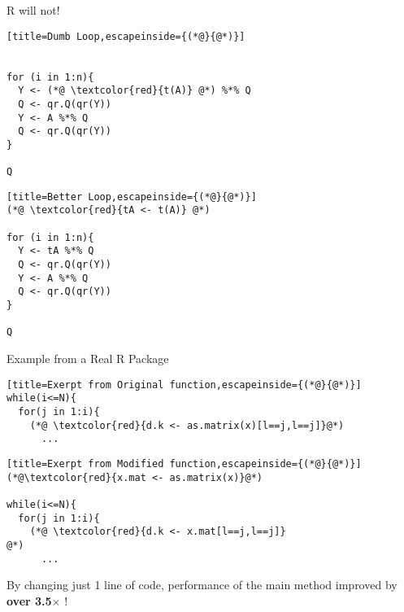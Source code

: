 \begin{frame}[fragile]{R will not!}
    \begin{center}
\begin{minipage}[t]{.45\textwidth}
\begin{lstlisting}[title=Dumb Loop,escapeinside={(*@}{@*)}]


for (i in 1:n){
  Y <- (*@ \textcolor{red}{t(A)} @*) %*% Q
  Q <- qr.Q(qr(Y))
  Y <- A %*% Q
  Q <- qr.Q(qr(Y))
}

Q
\end{lstlisting}
\end{minipage}
\begin{minipage}[t]{.45\textwidth}
\begin{lstlisting}[title=Better Loop,escapeinside={(*@}{@*)}]
(*@ \textcolor{red}{tA <- t(A)} @*)

for (i in 1:n){
  Y <- tA %*% Q
  Q <- qr.Q(qr(Y))
  Y <- A %*% Q
  Q <- qr.Q(qr(Y))
}

Q
\end{lstlisting}
\end{minipage}
\end{center}
\end{frame}


\begin{frame}[fragile]{Example from a Real R Package}
    \begin{center}
\begin{minipage}[t]{.6\textwidth}
\vspace{-.9cm}
\begin{lstlisting}[title=Exerpt from Original function,escapeinside={(*@}{@*)}]
while(i<=N){
  for(j in 1:i){
    (*@ \textcolor{red}{d.k <- as.matrix(x)[l==j,l==j]}@*)
      ...
\end{lstlisting}
\vspace{-.3cm}
\begin{lstlisting}[title=Exerpt from Modified function,escapeinside={(*@}{@*)}]
(*@\textcolor{red}{x.mat <- as.matrix(x)}@*)

while(i<=N){
  for(j in 1:i){
    (*@ \textcolor{red}{d.k <- x.mat[l==j,l==j]}
@*)
      ...
\end{lstlisting}
\end{minipage}
\begin{minipage}[t]{.34\textwidth}
\vspace{1.1cm}
By changing just 1 line of code, performance of the main
method improved by \textbf{over 3.5$\times$} !
\end{minipage}
\end{center}
\end{frame}


